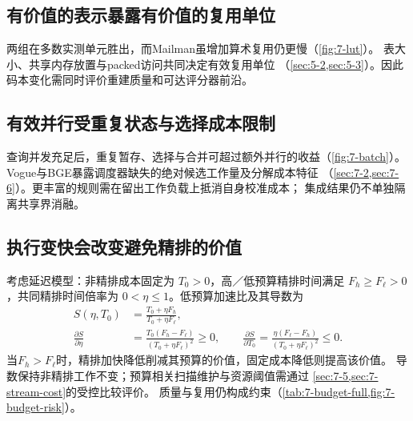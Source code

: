 \subsection{有价值的表示暴露有价值的复用单位}

两组在多数实测单元胜出，而Mailman虽增加算术复用仍更慢（\cref{fig:7-lut}）。
表大小、共享内存放置与packed访问共同决定有效复用单位
（\cref{sec:5-2,sec:5-3}）。因此码本变化需同时评价重建质量和可达评分器前沿。

\subsection{有效并行受重复状态与选择成本限制}

查询并发充足后，重复暂存、选择与合并可超过额外并行的收益（\cref{fig:7-batch}）。
Vogue与BGE暴露调度器缺失的绝对候选工作量及分解成本特征
（\cref{sec:7-2,sec:7-6}）。更丰富的规则需在留出工作负载上抵消自身校准成本；
集成结果仍不单独隔离共享界消融。

\subsection{执行变快会改变避免精排的价值}

考虑延迟模型：非精排成本固定为 $T_0>0$，高／低预算精排时间满足
$F_h\geq F_\ell>0$，共同精排时间倍率为 $0<\eta\leq1$。低预算加速比及其导数为
\begin{align}
 S(\eta,T_0)&=\frac{T_0+\eta F_h}{T_0+\eta F_\ell},
 \label{eq:8-refinement-sensitivity}\\
 \frac{\partial S}{\partial\eta}
 &=\frac{T_0(F_h-F_\ell)}{(T_0+\eta F_\ell)^2}\geq0,\qquad
 \frac{\partial S}{\partial T_0}
 =\frac{\eta(F_\ell-F_h)}{(T_0+\eta F_\ell)^2}\leq0.\nonumber
\end{align}
当$F_h>F_\ell$时，精排加快降低削减其预算的价值，固定成本降低则提高该价值。
导数保持非精排工作不变；预算相关扫描维护与资源阈值需通过
\cref{sec:7-5,sec:7-stream-cost}的受控比较评价。
质量与复用仍构成约束（\cref{tab:7-budget-full,fig:7-budget-risk}）。
